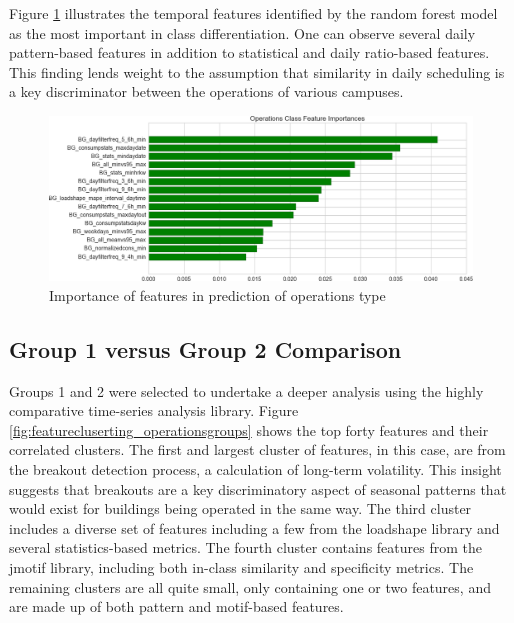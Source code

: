 Figure \ref{sec:featureimportance_operations} illustrates the temporal features identified by the random forest model as the most important in class differentiation. One can observe several daily pattern-based features in addition to statistical and daily ratio-based features. This finding lends weight to the assumption that similarity in daily scheduling is a key discriminator between the operations of various campuses.

\begin{figure}[ht!]
\begin{center}
\includegraphics[width=1\columnwidth]{figures/FeatureImportanceOperationsClass/FeatureImportanceOperationsClass}
\caption{{Importance of features in prediction of operations type
\label{sec:featureimportance_operations}%
}}
\end{center}
\end{figure}

\subsection{Group 1 versus Group 2 Comparison}
\label{sec:group1vsgroup2}

Groups 1 and 2 were selected to undertake a deeper analysis using the highly comparative time-series analysis library. Figure \ref{fig:featurecluserting_operationsgroups} shows the top forty features and their correlated clusters. The first and largest cluster of features, in this case, are from the breakout detection process, a calculation of long-term volatility. This insight suggests that breakouts are a key discriminatory aspect of seasonal patterns that would exist for buildings being operated in the same way. The third cluster includes a diverse set of features including a few from the loadshape library and several statistics-based metrics. The fourth cluster contains features from the jmotif library, including both in-class similarity and specificity metrics. The remaining clusters are all quite small, only containing one or two features, and are made up of both pattern and motif-based features.

